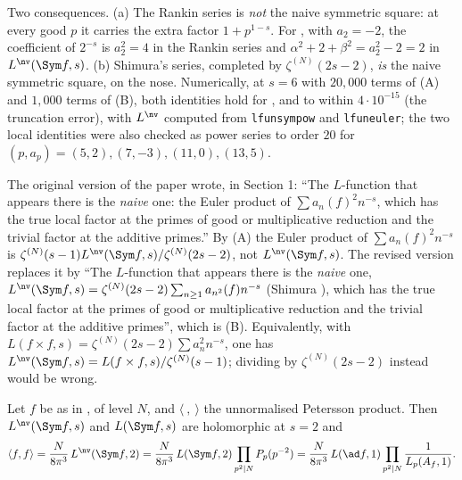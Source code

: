 Two consequences. (a) The Rankin series is \emph{not} the naive symmetric square: at every good $p$ it carries the extra factor $1+p^{1-s}$. For , with
$a_2=-2$, the coefficient of $2^{-s}$ is $a_2^2=4$ in the Rankin series and $\alpha^2+2+\beta^2=a_2^2-2=2$ in $L^{\nv}(\Sym f,s)$. (b) Shimura's series, completed by $\zeta^{(N)}(2s-2)$,
\emph{is} the naive symmetric square, on the nose. Numerically, at $s=6$ with $20{,}000$ terms of (A) and $1{,}000$ terms of (B), both identities hold for ,
 and  to within $4\cdot10^{-15}$ (the truncation error), with $L^{\nv}$ computed from \texttt{lfunsympow} and \texttt{lfuneuler}; the two local identities
were also checked as power series to order $20$ for $(p,a_p)=(5,2),(7,-3),(11,0),(13,5)$.

\begin{warning}\label{warn:lfunctions:rankin}
The original version of the paper wrote, in Section 1: ``The $L$-function that appears there is the \emph{naive} one: the Euler product of $\sum a_n(f)^2n^{-s}$,
which has the true local factor at the primes of good or multiplicative reduction and the trivial factor at the additive primes.'' By
(A) the Euler product of $\sum a_n(f)^2n^{-s}$ is $\zeta^{(N)}(s-1)L^{\nv}(\Sym f,s)/\zeta^{(N)}(2s-2)$, not $L^{\nv}(\Sym f,s)$. The revised version
replaces it by ``The $L$-function that appears there is the \emph{naive} one, $L^{\nv}(\Sym f,s)=\zeta^{(N)}(2s-2)\sum_{n\ge1}a_{n^2}(f)n^{-s}$ (Shimura \cite{Shimura75}), which has the
true local factor at the primes of good or multiplicative reduction and the trivial factor at the additive primes'', which is (B).
Equivalently, with $L(f\times f,s)=\zeta^{(N)}(2s-2)\sum a_n^2n^{-s}$, one has $L^{\nv}(\Sym f,s)=L(f\times f,s)/\zeta^{(N)}(s-1)$; dividing by $\zeta^{(N)}(2s-2)$ instead would be wrong.
\end{warning}

\begin{theorem}\label{thm:lfunctions:petersson-sym2}
Let $f$ be as in , of level $N$, and $\langle\ ,\ \rangle$ the unnormalised Petersson product. Then $L^{\nv}(\Sym f,s)$ and $L(\Sym f,s)$ are holomorphic at
$s=2$ and
\[
\langle f,f\rangle=\frac N{8\pi^3}\,L^{\nv}(\Sym f,2)=\frac N{8\pi^3}\,L(\Sym f,2)\prod_{p^2\mid N}P_p(p^{-2})=\frac N{8\pi^3}\,L(\ad f,1)\prod_{p^2\mid N}\frac1{L_p(A_f,1)}.
\]
\end{theorem}

